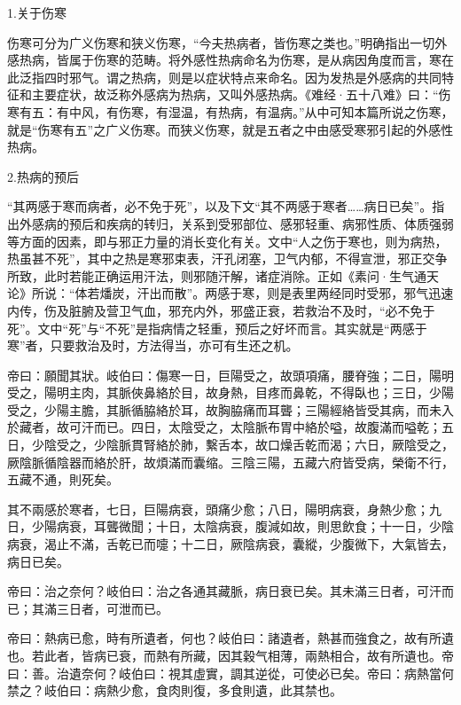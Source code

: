 \documentclass[draft,12pt]{ctexbook}
\begin{document}

1.关于伤寒

伤寒可分为广义伤寒和狭义伤寒，“今夫热病者，皆伤寒之类也。”明确指出一切外感热病，皆属于伤寒的范畴。将外感性热病命名为伤寒，是从病因角度而言，寒在此泛指四时邪气。谓之热病，则是以症状特点来命名。因为发热是外感病的共同特征和主要症状，故泛称外感病为热病，又叫外感热病。《难经·五十八难》曰：“伤寒有五：有中风，有伤寒，有湿温，有热病，有温病。”从中可知本篇所说之伤寒，就是“伤寒有五”之广义伤寒。而狭义伤寒，就是五者之中由感受寒邪引起的外感性热病。

2.热病的预后

“其两感于寒而病者，必不免于死”，以及下文“其不两感于寒者……病日已矣”。指出外感病的预后和疾病的转归，关系到受邪部位、感邪轻重、病邪性质、体质强弱等方面的因素，即与邪正力量的消长变化有关。文中“人之伤于寒也，则为病热，热虽甚不死”，其中之热是寒邪束表，汗孔闭塞，卫气内郁，不得宣泄，邪正交争所致，此时若能正确运用汗法，则邪随汗解，诸症消除。正如《素问·生气通天论》所说：“体若燔炭，汗出而散”。两感于寒，则是表里两经同时受邪，邪气迅速内传，伤及脏腑及营卫气血，邪充内外，邪盛正衰，若救治不及时，“必不免于死”。文中“死”与“不死”是指病情之轻重，预后之好坏而言。其实就是“两感于寒”者，只要救治及时，方法得当，亦可有生还之机。


\begin{yuanwen}
帝曰：願聞其狀。岐伯曰：傷寒一日，巨陽受之，故頭項痛，腰脊強；二日，陽明受之，陽明主肉，其脈俠鼻絡於目，故身熱，目疼而鼻乾，不得臥也；三日，少陽受之，少陽主膽，其脈循脇絡於耳，故胸脇痛而耳聾；三陽經絡皆受其病，而未入於藏者，故可汗而已。四日，太陰受之，太陰脈布胃中絡於嗌，故腹滿而嗌乾；五日，少陰受之，少陰脈貫腎絡於肺，繫舌本，故口燥舌乾而渴；六日，厥陰受之，厥陰脈循陰器而絡於肝，故煩滿而囊缩。三陰三陽，五藏六府皆受病，榮衛不行，五藏不通，則死矣。

其不兩感於寒者，七日，巨陽病衰，頭痛少愈；八日，陽明病衰，身熱少愈；九日，少陽病衰，耳聾微聞；十日，太陰病衰，腹減如故，則思飲食；十一日，少陰病衰，渴止不滿，舌乾已而嚏；十二日，厥陰病衰，囊縱，少腹微下，大氣皆去，病日已矣。

帝曰：治之奈何？岐伯曰：治之各通其藏脈，病日衰已矣。其未滿三日者，可汗而已；其滿三日者，可泄而已。

帝曰：熱病已愈，時有所遺者，何也？岐伯曰：諸遺者，熱甚而強食之，故有所遺也。若此者，皆病已衰，而熱有所藏，因其穀气相薄，兩熱相合，故有所遺也。帝曰：善。治遺奈何？岐伯曰：視其虛實，調其逆從，可使必已矣。帝曰：病熱當何禁之？岐伯曰：病熱少愈，食肉則復，多食則遺，此其禁也。
\end{yuanwen}
\end{document}
